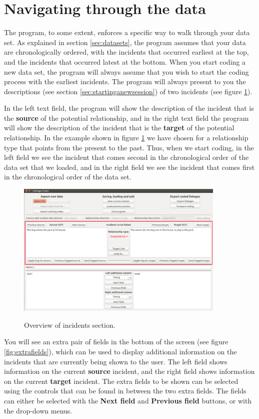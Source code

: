 \documentclass{memoir}
\begin{document}
\section{Navigating through the data}
\label{sec:navigatingdata}

The program, to some extent, enforces a specific way to walk through your data set. As explained in section \ref{sec:datasets}, the program assumes that your data are chronologically ordered, with the incidents that occurred earliest at the top, and the incidents that occurred latest at the bottom. When you start coding a new data set, the program will always assume that you wish to start the coding process with the earliest incidents. The program will always present to you the descriptions (see section \ref{sec:startinganewsession}) of two incidents (see figure \ref{fig:incidentsoverview}).

In the left text field, the program will show the description of the incident that is the \textbf{source} of the potential relationship, and in the right text field the program will show the description of the incident that is the \textbf{target} of the potential relationship. In the example shown in figure \ref{fig:incidentsoverview} we have chosen for a relationship type that points from the present to the past. Thus, when we start coding, in the left field we see the incident that comes second in the chronological order of the data set that we loaded, and in the right field we see the incident that comes first in the chronological order of the data set.

\begin{figure}[h!]
  \centering
  \caption{Overview of incidents section.}
  \includegraphics[width=100mm]{Screenshot_5.pdf}
  \label{fig:incidentsoverview}
\end{figure}

You will see an extra pair of fields in the bottom of the screen (see figure \ref{fig:extrafields}), which can be used to display additional information on the incidents that are currently being shown to the user. The left field shows information on the current \textbf{source} incident, and the right field shows information on the current \textbf{target} incident. The extra fields to be shown can be selected using the controls that can be found in between the two extra fields. The fields can either be selected with the \textbf{Next field} and \textbf{Previous field} buttons, or with the drop-down menus.
\end{document}

